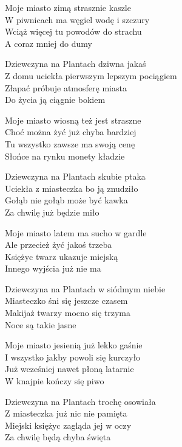 \begin{text}
    Moje miasto zimą strasznie kaszle\\
    W piwnicach ma węgiel wodę i szczury\\
    Wciąż więcej tu powodów do strachu\\
    A coraz mniej do dumy

    Dziewczyna na Plantach dziwna jakaś\\
    Z domu uciekła pierwszym lepszym pociągiem\\
    Złapać próbuje atmosferę miasta\\
    Do życia ją ciągnie bokiem

    Moje miasto wiosną też jest straszne\\
    Choć można żyć już chyba bardziej\\
    Tu wszystko zawsze ma swoją cenę\\
    Słońce na rynku monety kładzie

    Dziewczyna na Plantach skubie ptaka\\
    Uciekła z miasteczka bo ją znudziło\\
    Gołąb nie gołąb może być kawka\\
    Za chwilę już będzie miło

    Moje miasto latem ma sucho w gardle\\
    Ale przecież żyć jakoś trzeba\\
    Księżyc twarz ukazuje miejską\\
    Innego wyjścia już nie ma

    Dziewczyna na Plantach w siódmym niebie\\
    Miasteczko śni się jeszcze czasem\\
    Makijaż twarzy mocno się trzyma\\
    Noce są takie jasne

    Moje miasto jesienią już lekko gaśnie\\
    I wszystko jakby powoli się kurczyło\\
    Już wcześniej nawet płoną latarnie\\
    W knajpie kończy się piwo

    Dziewczyna na Plantach trochę osowiała\\
    Z miasteczka już nic nie pamięta\\
    Miejski księżyc zagląda jej w oczy\\
    Za chwilę będą chyba święta
\end{text}
\begin{chord}

\end{chord}